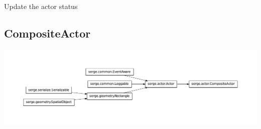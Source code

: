 \documentclass[letterpaper,10pt,english]{sphinxmanual}
\begin{document}
\begin{fulllineitems}
\begin{fulllineitems}
\end{fulllineitems}


\begin{fulllineitems}
\label{actor:serge.actor.Actor.updateActor}
Update the actor status

\end{fulllineitems}


\end{fulllineitems}



\subsection{CompositeActor}
\label{actor:compositeactor}
\includegraphics{inheritance-0bf734292bf093de72af693e165c5794f5cd99bc.pdf}
\end{document}
